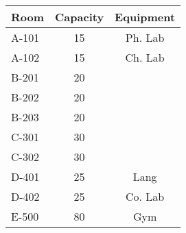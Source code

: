 \begin{tabular}{|lcc|}
  \hline
  Room  & Capacity & Equipment \\\hline\hline
  A-101 & 15 & Ph. Lab   \\
  A-102 & 15 & Ch. Lab   \\\hline
  B-201 & 20 & \\
  B-202 & 20 & \\
  B-203 & 20 & \\
  C-301 & 30 & \\
  C-302 & 30 & \\\hline
  D-401 & 25 & Lang \\
  D-402 & 25 & Co. Lab \\\hline
  E-500 & 80 & Gym \\\hline
\end{tabular}
